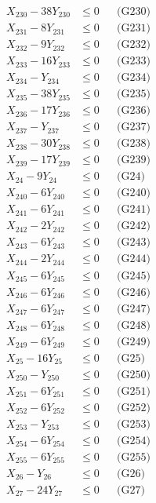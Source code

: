 \documentclass[a4paper,10pt]{article}
\begin{document}
{\begin{align}
X_{230} - 38Y_{230} &\leq 0 && \text{(G230)} \\
X_{231} - 8Y_{231} &\leq 0 && \text{(G231)} \\
X_{232} - 9Y_{232} &\leq 0 && \text{(G232)} \\
X_{233} - 16Y_{233} &\leq 0 && \text{(G233)} \\
X_{234} - Y_{234} &\leq 0 && \text{(G234)} \\
X_{235} - 38Y_{235} &\leq 0 && \text{(G235)} \\
X_{236} - 17Y_{236} &\leq 0 && \text{(G236)} \\
X_{237} - Y_{237} &\leq 0 && \text{(G237)} \\
X_{238} - 30Y_{238} &\leq 0 && \text{(G238)} \\
X_{239} - 17Y_{239} &\leq 0 && \text{(G239)} \\
X_{24} - 9Y_{24} &\leq 0 && \text{(G24)} \\
X_{240} - 6Y_{240} &\leq 0 && \text{(G240)} \\
X_{241} - 6Y_{241} &\leq 0 && \text{(G241)} \\
\allowbreak
X_{242} - 2Y_{242} &\leq 0 && \text{(G242)} \\
X_{243} - 6Y_{243} &\leq 0 && \text{(G243)} \\
X_{244} - 2Y_{244} &\leq 0 && \text{(G244)} \\
X_{245} - 6Y_{245} &\leq 0 && \text{(G245)} \\
X_{246} - 6Y_{246} &\leq 0 && \text{(G246)} \\
X_{247} - 6Y_{247} &\leq 0 && \text{(G247)} \\
X_{248} - 6Y_{248} &\leq 0 && \text{(G248)} \\
X_{249} - 6Y_{249} &\leq 0 && \text{(G249)} \\
X_{25} - 16Y_{25} &\leq 0 && \text{(G25)} \\
X_{250} - Y_{250} &\leq 0 && \text{(G250)} \\
X_{251} - 6Y_{251} &\leq 0 && \text{(G251)} \\
X_{252} - 6Y_{252} &\leq 0 && \text{(G252)} \\
X_{253} - Y_{253} &\leq 0 && \text{(G253)} \\
X_{254} - 6Y_{254} &\leq 0 && \text{(G254)} \\
X_{255} - 6Y_{255} &\leq 0 && \text{(G255)} \\
X_{26} - Y_{26} &\leq 0 && \text{(G26)} \\
X_{27} - 24Y_{27} &\leq 0 && \text{(G27)} \\

\end{align}}
\end{document}
